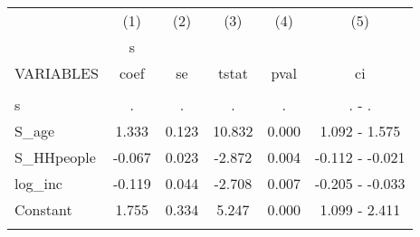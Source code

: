 \begin{tabular}{lccccc} \hline
 & (1) & (2) & (3) & (4) & (5) \\
 & s &  &  &  &  \\
VARIABLES & coef & se & tstat & pval & ci \\ \hline
 &  &  &  &  &  \\
s & . & . & . & . & . - . \\
S\_age & 1.333 & 0.123 & 10.832 & 0.000 & 1.092 - 1.575 \\
S\_HHpeople & -0.067 & 0.023 & -2.872 & 0.004 & -0.112 - -0.021 \\
log\_inc & -0.119 & 0.044 & -2.708 & 0.007 & -0.205 - -0.033 \\
Constant & 1.755 & 0.334 & 5.247 & 0.000 & 1.099 - 2.411 \\
 &  &  &  &  &  \\ \hline
\end{tabular}
